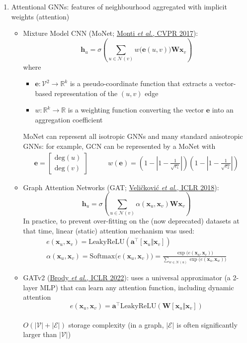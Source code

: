 \documentclass{article}
\begin{document}
\begin{enumerate}
	\item Attentional GNNs: features of neighbourhood aggregated with implicit weights (attention)
	\begin{itemize}[topsep=0pt]
		\item Mixture Model CNN (MoNet; \href{https://openaccess.thecvf.com/content_cvpr_2017/papers/Monti_Geometric_Deep_Learning_CVPR_2017_paper.pdf}{Monti \textit{et al.}, CVPR 2017}):
		$$\mathbf{h}_u=\sigma\left(\sum_{u\in\mathcal{N}(v)}w\big(\mathbf{e}(u,v)\big)\mathbf{W}\mathbf{x}_v\right)$$
		where 
		\begin{itemize}[topsep=0pt]
			\item $\mathbf{e}:\mathcal{V}^2\to\mathbb{R}^k$ is a pseudo-coordinate function that extracts a vector-based representation of the $(u,v)$ edge
			\item $w: \mathbb{R}^k\to\mathbb{R}$ is a weighting function converting the vector $\mathbf{e}$ into an aggregation coefficient
		\end{itemize}
		MoNet can represent all isotropic GNNs and many standard anisotropic GNNs: for example, GCN can be represented by a MoNet with 
		$$\begin{array}{cc}
			\mathbf{e}=\begin{bmatrix}
				\text{deg}(u) \\ \text{deg}(v) 
			\end{bmatrix}\quad & 
			\quad w(\mathbf{e})=\left(1-\left|1-\frac{1}{\sqrt{e_1}}\right|\right)\left(1-\left|1-\frac{1}{\sqrt{e_2}}\right|\right)
		\end{array}$$
	
		\item Graph Attention Networks (GAT; \href{https://openreview.net/pdf?id=rJXMpikCZ}{Veli\v{c}kovi\'{c} \textit{et al.}, ICLR 2018}):
		$$\mathbf{h}_u=\sigma\left(\sum_{u\in\mathcal{N}(v)}\alpha(\mathbf{x}_u,\mathbf{x}_v)\mathbf{W}\mathbf{x}_v\right)$$
		In practice, to prevent over-fitting on the (now deprecated) datasets at that time, linear (static) attention mechanism was used:
		\begin{gather*}
			e(\mathbf{x}_u,\mathbf{x}_v)=\text{LeakyReLU}(\mathbf{a}^\top[\mathbf{x}_u\Vert\mathbf{x}_v]) \\
			\alpha(\mathbf{x}_u,\mathbf{x}_v)=\text{Softmax}\big(e(\mathbf{x}_u,\mathbf{x}_v)\big)=\frac{\exp\big(e(\mathbf{x}_u,\mathbf{x}_v)\big)}{\sum_{w\in\mathcal{N}(u)}\exp\big(e(\mathbf{x}_u,\mathbf{x}_w)\big)}
		\end{gather*}
	
		\item GATv2 (\href{https://openreview.net/pdf?id=F72ximsx7C1}{Brody \textit{et al.}, ICLR 2022}): uses a universal approximator (a 2-layer MLP) that can learn any attention function, including dynamic attention
		$$e(\mathbf{x}_u,\mathbf{x}_v)=\mathbf{a}^\top\text{LeakyReLU}(\mathbf{W}[\mathbf{x}_u\Vert\mathbf{x}_v])$$
		\\ $O(|\mathcal{V}|+|\mathcal{E}|)$ storage complexity (in a graph, $|\mathcal{E}|$ is often significantly larger than $|\mathcal{V}|$)
		

\end{itemize}
\end{enumerate}
\end{document}
